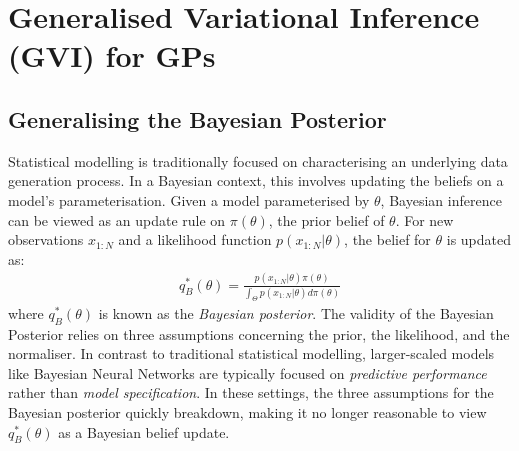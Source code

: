 \documentclass{article}
\newtheorem{theorem}{THEOREM}
\newtheorem{definition}[theorem]{DEFINITION}
\newenvironment{proof}{
PROOF:
\begin{quotation}}{
$\Box$ \end{quotation}}
\newcommand{\nats}{\mbox{\( \mathbb N \)}}
\numberwithin{equation}{section}
\begin{document}


\newpage
\section{Generalised Variational Inference (GVI) for GPs}
\subsection{Generalising the Bayesian Posterior}
Statistical modelling is traditionally focused on characterising an underlying data generation process. In a Bayesian context, this involves updating the beliefs on a model's parameterisation. Given a model parameterised by $\theta$, Bayesian inference can be viewed as an update rule on $\pi(\theta)$, the prior belief of $\theta$. For new observations $x_{1:N}$ and a likelihood function $p(x_{1:N}|\theta)$, the belief for $\theta$ is updated as:
\begin{align}
q_B^*(\theta) = \frac{p(x_{1:N}|\theta) \pi(\theta)}{\int_{\Theta} p(x_{1:N}|\theta) d \pi(\theta)}
\label{bayesian-posterior}
\end{align}
where $q_B^*(\theta)$ is known as the \textit{Bayesian posterior}. The validity of the Bayesian Posterior relies on three assumptions concerning the prior, the likelihood, and the normaliser. In contrast to traditional statistical modelling, larger-scaled models like Bayesian Neural Networks are typically focused on \textit{predictive performance} rather than \textit{model specification}. In these settings, the three  assumptions for the Bayesian posterior quickly breakdown, making it no longer reasonable to view $q_B^*(\theta)$ as a Bayesian belief update.
\end{document}
